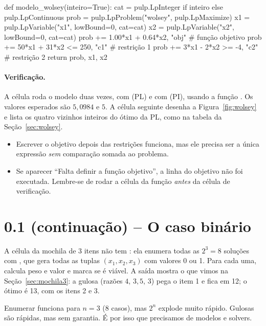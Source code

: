 \begin{codigo}
def modelo_wolsey(inteiro=True):
    cat = pulp.LpInteger if inteiro else pulp.LpContinuous
    prob = pulp.LpProblem("wolsey", pulp.LpMaximize)
    x1 = pulp.LpVariable("x1", lowBound=0, cat=cat)
    x2 = pulp.LpVariable("x2", lowBound=0, cat=cat)
    prob += 1.00*x1 + 0.64*x2, "obj"        # função objetivo
    prob += 50*x1 + 31*x2 <= 250, "c1"      # restrição 1
    prob += 3*x1 - 2*x2 >= -4, "c2"         # restrição 2
    return prob, x1, x2
\end{codigo}

\paragraph{Verificação.} A célula roda o modelo duas vezes, com  (PL) e com 
(PI), usando a função . Os valores esperados são $5{,}0984$ e $5$. A célula seguinte desenha a
Figura~\ref{fig:wolsey} e lista os quatro vizinhos inteiros do ótimo da PL, como na tabela da
Seção~\ref{sec:wolsey}.

\begin{atencao}
\begin{itemize}
  \item Escrever o objetivo depois das restrições funciona, mas ele precisa ser a única expressão
  \emph{sem} comparação somada ao problema.
  \item Se aparecer ``Falta definir a função objetivo'', a linha do objetivo não foi executada. Lembre-se de rodar a
  célula da função \emph{antes} da célula de verificação.
\end{itemize}
\end{atencao}

\section{0.1 (continuação) -- O caso binário}

A célula da mochila de 3 itens não tem : ela enumera todas as $2^3=8$ soluções com
, que gera todas as tuplas $(x_1,x_2,x_3)$ com valores 0 ou 1. Para cada uma,
calcula peso e valor e marca se é viável. A saída mostra o que vimos na Seção~\ref{sec:mochila3}: a gulosa (razões
$4$, $3{,}5$, $3$) pega o item 1 e fica em 12; o ótimo é 13, com os itens 2 e 3.

\begin{resumo}
Enumerar funciona para $n=3$ (8 casos), mas $2^n$ explode muito rápido. Gulosas são rápidas, mas sem garantia. É
por isso que precisamos de modelos e solvers.
\end{resumo}

